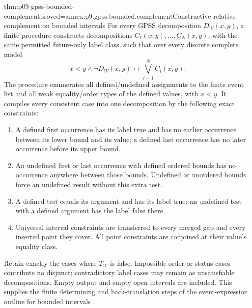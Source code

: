 \begin{hbtheorem}{thm:p09-gpss-bounded-complement}{proved=annex:p9.gpss.bounded.complement}{Constructive relative complement on bounded intervals}
For every GPSS decomposition \(D_W(x,y)\), a finite procedure
constructs decompositions \(C_1(x,y),\ldots,C_N(x,y)\), with
the same permitted future-only label class, such that over every
discrete complete model
\[
             x<y\land\neg D_W(x,y)
                        \longleftrightarrow\bigvee_{i=1}^{N}C_i(x,y).
\]
The procedure enumerates all defined/undefined assignments to the
finite event list and all weak equality/order types of the defined
values, with \(x<y\). It compiles every consistent case into one
decomposition by the following exact constraints:

\begin{enumerate}
\item A defined first occurrence has its label true and has no earlier
      occurrence between its lower bound and its value; a defined last
      occurrence has no later occurrence before its upper bound.
\item An undefined first or last occurrence with defined ordered bounds
      has no occurrence anywhere between those bounds. Undefined or
      unordered bounds force an undefined result without this extra test.
\item A defined test equals its argument and has its label true; an
      undefined test with a defined argument has the label false there.
\item Universal interval constraints are transferred to every merged
      gap and every inserted point they cover. All point constraints
      are conjoined at their value's equality class.
\end{enumerate}

Retain exactly the cases where \(T_W\) is false. Impossible order
or status cases contribute no disjunct; contradictory label cases
may remain as unsatisfiable decompositions. Empty output and empty
open intervals are included. This supplies the finite determining
and back-translation steps of the event-expression outline for
bounded intervals
\cite[Proposition~2.4, p.~171]{GabbayPnueliShelahStavi1980}.
\end{hbtheorem}


